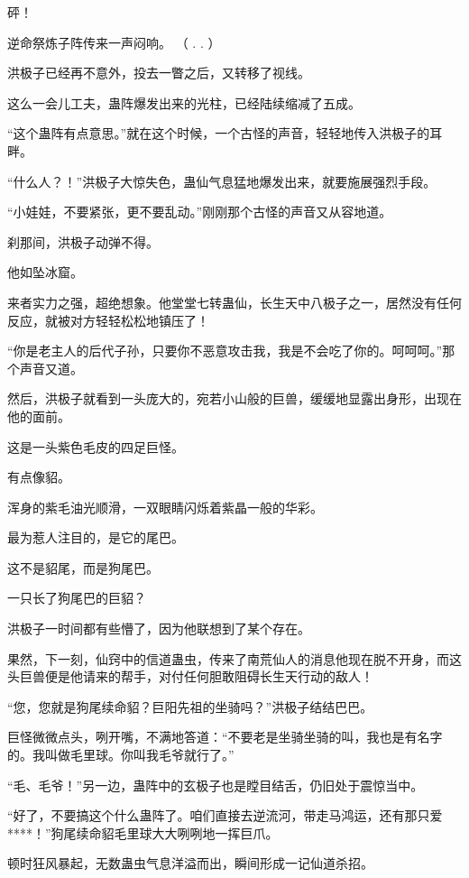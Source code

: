
\begin{this_body}

砰！

逆命祭炼子阵传来一声闷响。 （  .    .   ）

洪极子已经再不意外，投去一瞥之后，又转移了视线。

这么一会儿工夫，蛊阵爆发出来的光柱，已经陆续缩减了五成。

“这个蛊阵有点意思。”就在这个时候，一个古怪的声音，轻轻地传入洪极子的耳畔。

“什么人？！”洪极子大惊失色，蛊仙气息猛地爆发出来，就要施展强烈手段。

“小娃娃，不要紧张，更不要乱动。”刚刚那个古怪的声音又从容地道。

刹那间，洪极子动弹不得。

他如坠冰窟。

来者实力之强，超绝想象。他堂堂七转蛊仙，长生天中八极子之一，居然没有任何反应，就被对方轻轻松松地镇压了！

“你是老主人的后代子孙，只要你不恶意攻击我，我是不会吃了你的。呵呵呵。”那个声音又道。

然后，洪极子就看到一头庞大的，宛若小山般的巨兽，缓缓地显露出身形，出现在他的面前。

这是一头紫色毛皮的四足巨怪。

有点像貂。

浑身的紫毛油光顺滑，一双眼睛闪烁着紫晶一般的华彩。

最为惹人注目的，是它的尾巴。

这不是貂尾，而是狗尾巴。

一只长了狗尾巴的巨貂？

洪极子一时间都有些懵了，因为他联想到了某个存在。

果然，下一刻，仙窍中的信道蛊虫，传来了南荒仙人的消息他现在脱不开身，而这头巨兽便是他请来的帮手，对付任何胆敢阻碍长生天行动的敌人！

“您，您就是狗尾续命貂？巨阳先祖的坐骑吗？”洪极子结结巴巴。

巨怪微微点头，咧开嘴，不满地答道：“不要老是坐骑坐骑的叫，我也是有名字的。我叫做毛里球。你叫我毛爷就行了。”

“毛、毛爷！”另一边，蛊阵中的玄极子也是瞠目结舌，仍旧处于震惊当中。

“好了，不要搞这个什么蛊阵了。咱们直接去逆流河，带走马鸿运，还有那只爱****！”狗尾续命貂毛里球大大咧咧地一挥巨爪。

顿时狂风暴起，无数蛊虫气息洋溢而出，瞬间形成一记仙道杀招。


\end{this_body}
